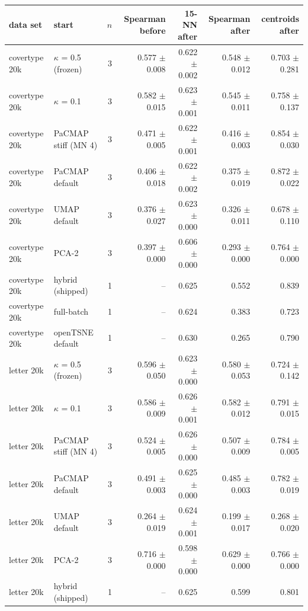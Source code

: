 \begin{tabular}{llrrrrr}
\toprule
data set & start & $n$ & Spearman before & 15-NN after & Spearman after & centroids after \\
\midrule
covertype 20k & \magnet{} $\kappa$ = 0.5 (frozen) & 3 & 0.577 $\pm$ 0.008 & 0.622 $\pm$ 0.002 & 0.548 $\pm$ 0.012 & 0.703 $\pm$ 0.281 \\
covertype 20k & \magnet{} $\kappa$ = 0.1 & 3 & 0.582 $\pm$ 0.015 & 0.623 $\pm$ 0.001 & 0.545 $\pm$ 0.011 & 0.758 $\pm$ 0.137 \\
covertype 20k & PaCMAP stiff (MN 4) & 3 & 0.471 $\pm$ 0.005 & 0.622 $\pm$ 0.001 & 0.416 $\pm$ 0.003 & 0.854 $\pm$ 0.030 \\
covertype 20k & PaCMAP default & 3 & 0.406 $\pm$ 0.018 & 0.622 $\pm$ 0.002 & 0.375 $\pm$ 0.019 & 0.872 $\pm$ 0.022 \\
covertype 20k & UMAP default & 3 & 0.376 $\pm$ 0.027 & 0.623 $\pm$ 0.000 & 0.326 $\pm$ 0.011 & 0.678 $\pm$ 0.110 \\
covertype 20k & PCA-2 & 3 & 0.397 $\pm$ 0.000 & 0.606 $\pm$ 0.000 & 0.293 $\pm$ 0.000 & 0.764 $\pm$ 0.000 \\
covertype 20k & \magnet{} hybrid (shipped) & 1 & -- & 0.625 & 0.552 & 0.839 \\
covertype 20k & \magnet{} full-batch & 1 & -- & 0.624 & 0.383 & 0.723 \\
covertype 20k & openTSNE default & 1 & -- & 0.630 & 0.265 & 0.790 \\
\midrule
letter 20k & \magnet{} $\kappa$ = 0.5 (frozen) & 3 & 0.596 $\pm$ 0.050 & 0.623 $\pm$ 0.000 & 0.580 $\pm$ 0.053 & 0.724 $\pm$ 0.142 \\
letter 20k & \magnet{} $\kappa$ = 0.1 & 3 & 0.586 $\pm$ 0.009 & 0.626 $\pm$ 0.001 & 0.582 $\pm$ 0.012 & 0.791 $\pm$ 0.015 \\
letter 20k & PaCMAP stiff (MN 4) & 3 & 0.524 $\pm$ 0.005 & 0.626 $\pm$ 0.000 & 0.507 $\pm$ 0.009 & 0.784 $\pm$ 0.005 \\
letter 20k & PaCMAP default & 3 & 0.491 $\pm$ 0.003 & 0.625 $\pm$ 0.000 & 0.485 $\pm$ 0.003 & 0.782 $\pm$ 0.019 \\
letter 20k & UMAP default & 3 & 0.264 $\pm$ 0.019 & 0.624 $\pm$ 0.001 & 0.199 $\pm$ 0.017 & 0.268 $\pm$ 0.020 \\
letter 20k & PCA-2 & 3 & 0.716 $\pm$ 0.000 & 0.598 $\pm$ 0.000 & 0.629 $\pm$ 0.000 & 0.766 $\pm$ 0.000 \\
letter 20k & \magnet{} hybrid (shipped) & 1 & -- & 0.625 & 0.599 & 0.801 \\

\end{tabular}
